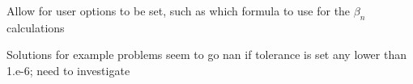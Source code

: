 
\begin{DoxyRefList}
\item[\label{todo__todo000001}%
\Hypertarget{todo__todo000001}%
Member \mbox{\hyperlink{namespaceopt_a8f434753958049daab7129ea247a97ff}{opt\+:\+:ncgd\+\_\+\+Xd}} (std\+::function$<$ double(std\+::vector$<$ double $>$)$>$f, std\+::vector$<$ double $>$ \&x0, double tol=1.\+e-\/6, bool verbose=true)]Allow for user options to be set, such as which formula to use for the $\beta_n$ calculations 

Solutions for example problems seem to go \textquotesingle{}nan\textquotesingle{} if tolerance is set any lower than 1.\+e-\/6; need to investigate 
\end{DoxyRefList}
